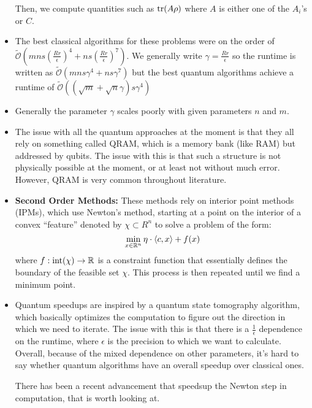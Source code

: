 \documentclass[10pt]{article}
\renewcommand{\tilde}{\widetilde}
\begin{document}
\begin{itemize}
			Then, we compute quantities such as \( \tr(A \rho) \) where \( A  \) is either one of the \( A_i \)'s 
			or \( C \). 
		\item The best classical algorithms for these problems were on the order of \( \tilde{\mathcal O}
			\left( mns \left( \frac{Rr}{\epsilon} \right)^{4} + ns \left( \frac{Rr}{\epsilon} \right)^{7} \right) \). We
			generally write \( \gamma = \frac{Rr}{\epsilon} \) so the runtime is written as 
			\( \tilde{\mathcal O}\left( mns\gamma^{4} + ns \gamma^{7} \right)  \)
			but the best quantum algorithms achieve a runtime of \( \tilde{\mathcal O}\left((\sqrt{m} + \sqrt{n} \gamma)
			s \gamma^{4}\right)\)
		\item Generally the parameter \( \gamma \) scales poorly with given parameters \( n \) and \( m \).  
		\item The issue with all the quantum approaches at the moment is that they all rely on something called 
			QRAM, which is a memory bank (like RAM) but addressed by qubits. The issue with this is that such a 
			structure is not physically possible at the moment, or at least not without much error. However, 
			QRAM is very common throughout literature. 
		\item \textbf{Second Order Methods:} These methods rely on interior point methods (IPMs), which use Newton's 
			method, starting at a point on the interior of a convex ``feature'' denoted by \( \chi \subset R^{n} \)
			to solve a problem of the form:
			\[
			\min_{x \in \mathbb R^{n}} \eta \cdot \langle c, x \rangle + f(x)
			\] 
			where \( f : \mathrm{int}(\chi) \to \mathbb R \) is a constraint function that essentially defines the boundary 
			of the feasible set \( \chi \). This process is then repeated until we find a minimum point.  
		\item Quantum speedups are inspired by a quantum state tomography algorithm, which basically optimizes
			the computation to figure out the direction in which we need to iterate. The issue with this is that 
			there is a \( \frac{1}{\epsilon} \) dependence on the runtime, where \( \epsilon \) is the 
			precision to which we want to calculate. Overall, because of the mixed dependence on other parameters, 
			it's hard to say whether quantum algorithms have an overall speedup over classical ones. 

			There has been a recent advancement that speedsup the Newton step in computation, that is 
			worth looking at.  
	\end{itemize}
\end{document}

